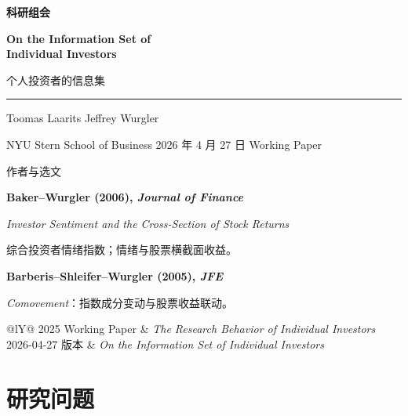 \begin{frame}[plain]
  \vfill
  {\small\color{wine}\bfseries 科研组会\par}
  \vspace{5mm}
  {\fontsize{22}{26}\selectfont\bfseries On the Information Set of\\Individual Investors\par}
  \vspace{3mm}
  {\large\color{wine}个人投资者的信息集\par}
  \vspace{3mm}
  {\color{wine}\rule{.95\linewidth}{.75pt}}\par\medskip
  Toomas Laarits \quad Jeffrey Wurgler\par
  {\small NYU Stern School of Business \hfill 2026 年 4 月 27 日 Working Paper}\par
  \vspace{4mm}{\small 汇报人：杨博远\quad 27国金博0}\vfill
\end{frame}

\begin{frame}[label=authors]{作者与选文}
  \smallskip
  {\small
  \textbf{Baker--Wurgler (2006), \textit{Journal of Finance}}\par
  \textit{Investor Sentiment and the Cross-Section of Stock Returns}\par
  综合投资者情绪指数；情绪与股票横截面收益。\par\smallskip
  \textbf{Barberis--Shleifer--Wurgler (2005), \textit{JFE}}\par
  \textit{Comovement}：指数成分变动与股票收益联动。\par}
  \smallskip
  \smallskip\small
  \begin{tabularx}{\linewidth}{@{}lY@{}}
    2025 Working Paper & \textit{The Research Behavior of Individual Investors}\\
    2026-04-27 版本 & \textit{On the Information Set of Individual Investors}
  \end{tabularx}
\end{frame}

\section{研究问题}


